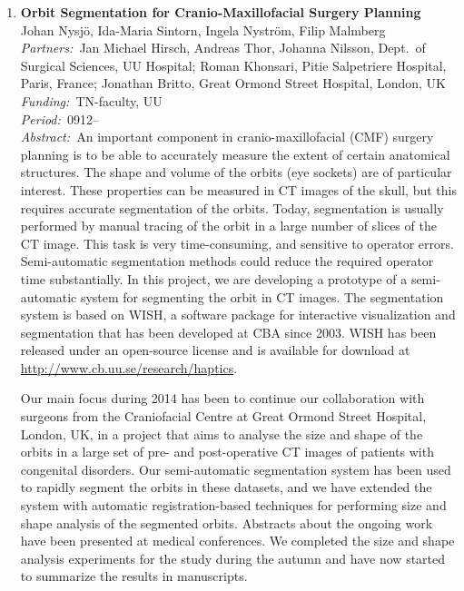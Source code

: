 \documentclass[10pt, a4paper]{article}
\newcommand{\aabstract}[1]{\emph{Abstract:~}#1}
\newcommand{\ffunding}[1]{\emph{Funding:~}#1\\}
\newcommand{\ppartners}[1]{\emph{Partners:~}#1\\}
\newcommand{\pperiod}[1]{\emph{Period:~}#1\\}
\begin{document}
{\begin{enumerate}
\item
\label{project:orbit_segmentation}
\textbf{Orbit Segmentation for Cranio-Maxillofacial Surgery Planning}\\
Johan Nysj\"{o}, Ida-Maria Sintorn, Ingela Nystr{\"o}m, Filip Malmberg\\
\ppartners{Jan Michael Hirsch, Andreas Thor, Johanna Nilsson, Dept.~of Surgical Sciences, UU Hospital; Roman Khonsari, Pitie Salpetriere Hospital, Paris, France; Jonathan Britto, Great Ormond Street Hospital, London, UK}
\ffunding{TN-faculty, UU}
\pperiod{0912--}
\aabstract{An important component in cranio-maxillofacial (CMF) surgery planning is to be able to accurately measure the extent of certain anatomical structures. The shape and volume of the orbits (eye sockets) are of particular interest. These properties can be measured in CT images of the skull, but this requires accurate segmentation of the orbits. Today, segmentation is usually performed by manual tracing of the orbit in a large number of slices of the CT image. This task is very time-consuming, and sensitive to operator errors. Semi-automatic segmentation methods could reduce the required operator time substantially. In this project, we are developing a prototype of a semi-automatic system for segmenting the orbit in CT images. The segmentation system is based on WISH, a software package for interactive visualization and segmentation that has been developed at CBA since 2003. WISH has been released under an open-source license and is available for download at \url{http://www.cb.uu.se/research/haptics}.

Our main focus during 2014 has been to continue our collaboration with surgeons from the Craniofacial Centre at Great Ormond Street Hospital, London, UK, in a project that aims to analyse the size and shape of the orbits in a large set of pre- and post-operative CT images of patients with congenital disorders. Our semi-automatic segmentation system has been used to rapidly segment the orbits in these datasets, and we have extended the system with automatic registration-based techniques for performing size and shape analysis of the segmented orbits. Abstracts about the ongoing work have been presented at medical conferences. We completed the size and shape analysis experiments for the study during the autumn and have now started to summarize the results in manuscripts.}



\end{enumerate}}
\end{document}
